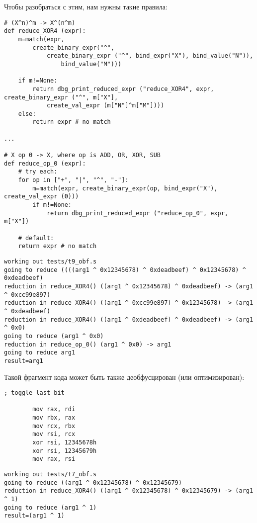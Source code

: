Чтобы разобраться с этим, нам нужны такие правила:

\begin{lstlisting}
# (X^n)^m -> X^(n^m)
def reduce_XOR4 (expr):
    m=match(expr, 
        create_binary_expr("^",
            create_binary_expr ("^", bind_expr("X"), bind_value("N")),
                bind_value("M")))
    
    if m!=None:
        return dbg_print_reduced_expr ("reduce_XOR4", expr, create_binary_expr ("^", m["X"], 
            create_val_expr (m["N"]^m["M"])))
    else:
        return expr # no match

...

# X op 0 -> X, where op is ADD, OR, XOR, SUB
def reduce_op_0 (expr):
    # try each:
    for op in ["+", "|", "^", "-"]:
        m=match(expr, create_binary_expr(op, bind_expr("X"), create_val_expr (0)))
        if m!=None:
            return dbg_print_reduced_expr ("reduce_op_0", expr, m["X"])

    # default:
    return expr # no match
\end{lstlisting}

\begin{lstlisting}
working out tests/t9_obf.s
going to reduce ((((arg1 ^ 0x12345678) ^ 0xdeadbeef) ^ 0x12345678) ^ 0xdeadbeef)
reduction in reduce_XOR4() ((arg1 ^ 0x12345678) ^ 0xdeadbeef) -> (arg1 ^ 0xcc99e897)
reduction in reduce_XOR4() ((arg1 ^ 0xcc99e897) ^ 0x12345678) -> (arg1 ^ 0xdeadbeef)
reduction in reduce_XOR4() ((arg1 ^ 0xdeadbeef) ^ 0xdeadbeef) -> (arg1 ^ 0x0)
going to reduce (arg1 ^ 0x0)
reduction in reduce_op_0() (arg1 ^ 0x0) -> arg1
going to reduce arg1
result=arg1
\end{lstlisting}

Такой фрагмент кода может быть также деобфусцирован (или оптимизирован):

\begin{lstlisting}
; toggle last bit

        mov rax, rdi
        mov rbx, rax
        mov rcx, rbx
        mov rsi, rcx
        xor rsi, 12345678h
        xor rsi, 12345679h
        mov rax, rsi
\end{lstlisting}

\begin{lstlisting}
working out tests/t7_obf.s
going to reduce ((arg1 ^ 0x12345678) ^ 0x12345679)
reduction in reduce_XOR4() ((arg1 ^ 0x12345678) ^ 0x12345679) -> (arg1 ^ 1)
going to reduce (arg1 ^ 1)
result=(arg1 ^ 1)
\end{lstlisting}

